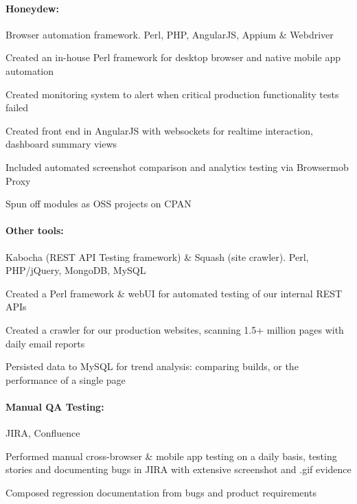 \begin{position}

  \paragraph{Honeydew:} Browser automation framework. Perl, PHP, AngularJS, Appium \& Webdriver
  \begin{myitem}
  \item Created an in-house Perl framework for desktop browser and native mobile app automation
  \item Created monitoring system to alert when critical production functionality tests failed
  \item Created front end in AngularJS with websockets for realtime interaction, dashboard summary views
  \item Included automated screenshot comparison and analytics testing via Browsermob Proxy
  \item Spun off modules as OSS projects on CPAN
  \end{myitem}
  \paragraph{Other tools:} Kabocha (REST API Testing framework) \& Squash (site crawler). Perl, PHP/jQuery, MongoDB, MySQL
  \begin{myitem}
  \item Created a Perl framework \& webUI for automated testing of our internal REST APIs
  \item Created a crawler for our production websites, scanning 1.5+ million pages with daily email reports
  \item Persisted data to MySQL for trend analysis: comparing builds, or the performance of a single page
  \end{myitem}
  \paragraph{Manual QA Testing:} JIRA, Confluence
  \begin{myitem}
  \item Performed manual cross-browser \& mobile app testing on a daily basis, testing stories and documenting bugs in JIRA with extensive screenshot and .gif evidence
  \item Composed regression documentation from bugs and product requirements
  \end{myitem}
\end{position}
%
